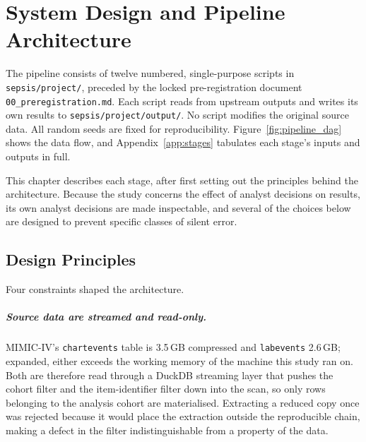 \chapter{System Design and Pipeline Architecture}
\label{ch:design}

\begin{sloppypar}
The pipeline consists of twelve numbered, single-purpose scripts in
\texttt{sepsis/\allowbreak project/}, preceded by the locked pre-registration
document \texttt{00\_\allowbreak preregistration.md}. Each script reads from
upstream outputs and writes its own results to
\texttt{sepsis/\allowbreak project/\allowbreak output/}. No script modifies the
original source data. All random seeds are fixed for reproducibility.
Figure~\ref{fig:pipeline_dag} shows the data flow, and
Appendix~\ref{app:stages} tabulates each stage's inputs and outputs in full.
\end{sloppypar}

This chapter describes each stage, after first setting out the principles
behind the architecture. Because the study concerns the effect of analyst
decisions on results, its own analyst decisions are made inspectable, and
several of the choices below are designed to prevent specific classes of silent
error.


\section{Design Principles}
\label{sec:design_principles}

Four constraints shaped the architecture.

\paragraph{Source data are streamed and read-only.}
MIMIC-IV's \texttt{chartevents} table is 3.5\,GB compressed and
\texttt{labevents} 2.6\,GB; expanded, either exceeds the working memory of the
machine this study ran on. Both are therefore read through a DuckDB streaming
layer that pushes the cohort filter and the item-identifier filter down into the
scan, so only rows belonging to the analysis cohort are materialised.
Extracting a reduced copy once was rejected because it would place the
extraction outside the reproducible chain, making a defect in the filter
indistinguishable from a property of the data.

